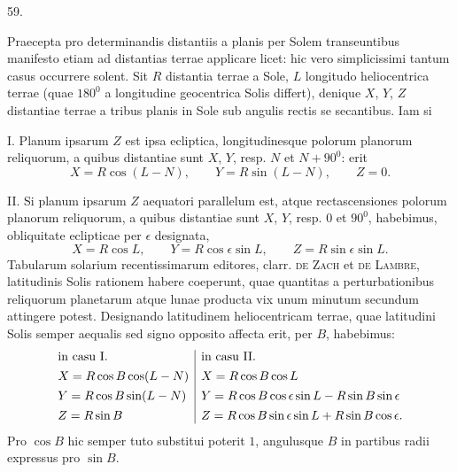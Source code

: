 \par\medskip
{}
\begin{center}59.\end{center}
Praecepta pro determinandis distantiis a planis per Solem transeuntibus manifesto etiam ad distantias terrae applicare licet: hic vero simplicissimi tantum casus occurrere solent. Sit $R$ distantia terrae a Sole, $L$ longitudo heliocentrica terrae (quae $180^0$ a longitudine geocentrica Solis differt), denique $X$, $Y$, $Z$ distantiae terrae a tribus planis in Sole sub angulis rectis se secantibus. Iam si

I. Planum ipsarum $Z$ est ipsa ecliptica, longitudinesque polorum planorum reliquorum, a quibus distantiae sunt $X$, $Y$, resp. $N$ et $N+90^0$: erit
\[
X=R\cos(L-N),\qquad Y=R\sin(L-N),\qquad Z=0.
\]

II. Si planum ipsarum $Z$ aequatori parallelum est, atque rectascensiones polorum planorum reliquorum, a quibus distantiae sunt $X$, $Y$, resp. $0$ et $90^0$, habebimus, obliquitate eclipticae per $\epsilon$ designata,
\[
X=R\cos L,\qquad Y=R\cos\epsilon\sin L,\qquad Z=R\sin\epsilon\sin L.
\]
Tabularum solarium recentissimarum editores, clarr. \textsc{de Zach} et \textsc{de Lambre}, latitudinis Solis rationem habere coeperunt, quae quantitas a perturbationibus reliquorum planetarum atque lunae producta vix unum minutum secundum attingere potest. Designando latitudinem heliocentricam terrae, quae latitudini Solis semper aequalis sed signo opposito affecta erit, per $B$, habebimus:
\[
\begin{array}{@{}l|l@{}}
\text{in casu I.}&\text{in casu II.}\\[.4em]
X=R\cos B\cos(L-N)&X=R\cos B\cos L\\[.4em]
Y=R\cos B\sin(L-N)&Y=R\cos B\cos\epsilon\sin L-R\sin B\sin\epsilon\\[.4em]
Z=R\sin B&Z=R\cos B\sin\epsilon\sin L+R\sin B\cos\epsilon.
\end{array}
\]
Pro $\cos B$ hic semper tuto substitui poterit $1$, angulusque $B$ in partibus radii expressus pro $\sin B$.

